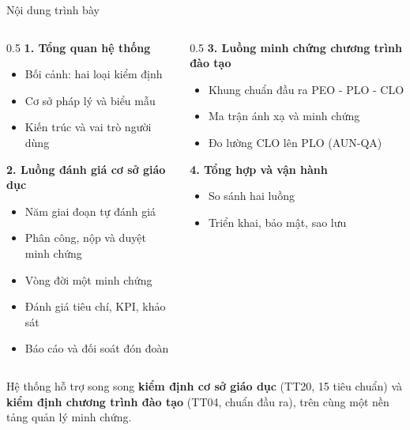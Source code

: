 \documentclass[aspectratio=169, 11pt]{beamer}
\begin{document}
\begin{frame}{Nội dung trình bày}
\vspace{0.05cm}
\begin{columns}[T]
\begin{column}{0.5\textwidth}
\textbf{\color{daumaroon}1. Tổng quan hệ thống}
\begin{itemize}\footnotesize
  \item Bối cảnh: hai loại kiểm định
  \item Cơ sở pháp lý và biểu mẫu
  \item Kiến trúc và vai trò người dùng
\end{itemize}
\vspace{0.2cm}
\textbf{\color{daumaroon}2. Luồng đánh giá cơ sở giáo dục}
\begin{itemize}\footnotesize
  \item Năm giai đoạn tự đánh giá
  \item Phân công, nộp và duyệt minh chứng
  \item Vòng đời một minh chứng
  \item Đánh giá tiêu chí, KPI, khảo sát
  \item Báo cáo và đối soát đón đoàn
\end{itemize}
\end{column}
\begin{column}{0.5\textwidth}
\textbf{\color{daumaroon}3. Luồng minh chứng chương trình đào tạo}
\begin{itemize}\footnotesize
  \item Khung chuẩn đầu ra PEO - PLO - CLO
  \item Ma trận ánh xạ và minh chứng
  \item Đo lường CLO lên PLO (AUN-QA)
\end{itemize}
\vspace{0.2cm}
\textbf{\color{daumaroon}4. Tổng hợp và vận hành}
\begin{itemize}\footnotesize
  \item So sánh hai luồng
  \item Triển khai, bảo mật, sao lưu
\end{itemize}
\end{column}
\end{columns}
\vspace{0.12cm}
\begin{keypoint}
Hệ thống hỗ trợ song song \textbf{kiểm định cơ sở giáo dục} (TT20, 15 tiêu chuẩn) và \textbf{kiểm định chương trình đào tạo} (TT04, chuẩn đầu ra), trên cùng một nền tảng quản lý minh chứng.
\end{keypoint}
\end{frame}
\end{document}
